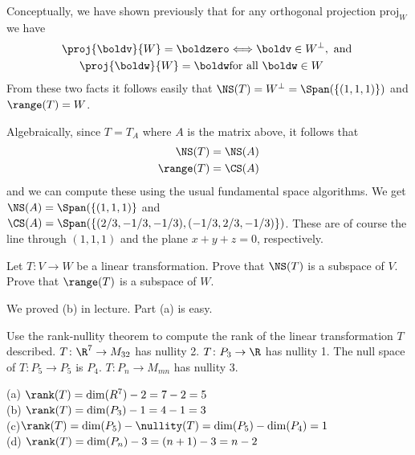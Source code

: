 \begin{solution}
Conceptually, we have shown previously that for any orthogonal projection $\text{proj}_W$ we have 
\begin{align*}
\proj{\boldv}{W}=\boldzero&\Longleftrightarrow \boldv\in W^\perp, \text{ and }\\
\proj{\boldw}{W}=\boldw&\text{for all } \boldw\in W
\end{align*}
From these two facts it follows easily that $\NS(T)=W^\perp=\Span(\{(1,1,1)\})$ and $\range(T)=W$.

Algebraically, since $T=T_A$ where $A$ is the matrix above, it follows that 
\begin{align*}
\NS(T)&=\NS(A)\\
\range(T)&=\CS(A)
\end{align*}
and we can compute these using the usual fundamental space algorithms. We get $\NS(A)=\Span(\{(1,1,1)\}$ and $\CS(A)=\Span(\{(2/3,-1/3,-1/3),(-1/3,2/3,-1/3)\})$. These are of course the line through $(1,1,1)$ and the plane $x+y+z=0$, respectively. 
 
\end{solution}

\ii Let $T\colon V\rightarrow W$ be a linear transformation. 
\bb
\ii Prove that $\NS(T)$ is a subspace of $V$. 
\ii Prove that $\range(T)$ is a subspace of $W$. 
\ee
\begin{solution}
\noindent We proved (b) in lecture. Part (a) is easy. 
\end{solution}
\ii Use the rank-nullity theorem to compute the rank of the linear transformation $T$ described. 
\bb
\ii $T\colon\R^7\rightarrow M_{32}$ has nullity 2.
\ii $T\colon P_3\rightarrow \R$ has nullity 1.
\ii The null space of $T\colon P_5 \rightarrow P_5$ is $P_4$.
\ii $T\colon P_n\rightarrow M_{mn}$ has nullity 3.
\ee
\begin{solution}
\noindent
(a)
$\rank(T) = \dim(R^7) - 2 = 7-2=5$
\\
(b)
$\rank(T) = \dim(P_3) - 1 = 4-1=3$
\\
(c)$\rank(T) = \dim(P_5) - \nullity(T) = \dim(P_5)-\dim(P_4) = 1$
\\
(d) 
$\rank(T) = \dim(P_n)-3 = (n+1) - 3 = n-2$
\end{solution}

